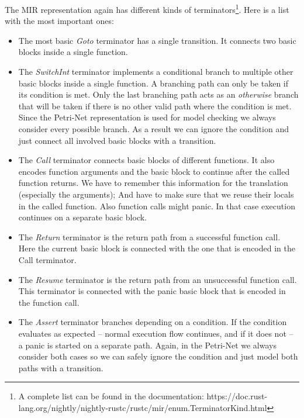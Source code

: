 The MIR representation again has different kinds of terminators\footnote{A complete list can be found in the documentation: https://doc.rust-lang.org/nightly/nightly-rustc/rustc/mir/enum.TerminatorKind.html}. Here is a list with the most important ones:
\begin{itemize}
    \item The most basic \textit{Goto} terminator has a single transition.
    It connects two basic blocks inside a single function.
    \item The \textit{SwitchInt} terminator implements a conditional branch to multiple other basic blocks inside a single function.
    A branching path can only be taken if its condition is met.
    Only the last branching path acts as an \textit{otherwise} branch that will be taken if there is no other valid path where the condition is met.
    Since the Petri-Net representation is used for model checking we always consider every possible branch.
    As a result we can ignore the condition and just connect all involved basic blocks with a transition.
    \item The \textit{Call} terminator connects basic blocks of different functions.
    It also encodes function arguments and the basic block to continue after the called function returns.
    We have to remember this information for the translation (especially the arguments);
    And have to make sure that we reuse their locals in the called function.
    Also function calls might panic.
    In that case execution continues on a separate basic block.
    \item The \textit{Return} terminator is the return path from a successful function call.
    Here the current basic block is connected with the one that is encoded in the Call terminator.
    \item The \textit{Resume} terminator is the return path from an unsuccessful function call.
    This terminator is connected with the panic basic block that is encoded in the function call.
    \item The \textit{Assert} terminator branches depending on a condition.
    If the condition evaluates as expected -- normal execution flow continues, and if it does not -- a panic is started on a separate path.
    Again, in the Petri-Net we always consider both cases so we can safely ignore the condition and just model both paths with a transition.
\end{itemize}

